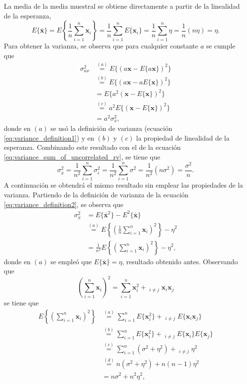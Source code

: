 \documentclass[a4paper]{report}
\newcommand{\x}{\mathbf{x}}
\begin{document}
La media de la media muestral se obtiene directamente a partir de la linealidad de la esperanza,
\[
 E\{\bar{\x}\}=E\left\{\frac{1}{n}\sum_{i=1}^{n}\x_i\right\}=\frac{1}{n}\sum_{i=1}^{n}E\{\x_i\}=\frac{1}{n}\sum_{i=1}^{n}\eta=\frac{1}{n}(n\eta)=\eta.
\]
Para obtener la varianza, se observa que para cualquier constante \(a\) se cumple que
\begin{align*}
 \sigma_{ax}^2&\overset{(a)}{=}E\{(a\x-E\{a\x\})^2\}\\
   &\overset{(b)}{=}E\{(a\x-aE\{\x\})^2\}\\
   &=E\{a^2(\x-E\{\x\})^2\}\\
   &\overset{(c)}{=}a^2E\{(\x-E\{\x\})^2\}\\
   &=a^2\sigma_x^2,
\end{align*}
donde en \((a)\) se usó la definición de varianza (ecuación \ref{eq:variance_definition1}) y en \((b)\) y \((c)\) la propiedad de linealidad de la esperanza.
Combinando este resultado con el de la ecuación \ref{eq:variance_sum_of_uncorrelated_rv}, se tiene que
\[
 \sigma_{\bar{x}}^2=\frac{1}{n^2}\sum_{i=1}^{n}\sigma_i^2=\frac{1}{n^2}\sum_{i=1}^{n}\sigma^2=\frac{1}{n^2}(n\sigma^2)=\frac{\sigma^2}{n}.
\]
A continuación se obtendrá  el mismo resultado sin emplear las propiedades de la varianza. Partiendo de la definición de varianza de la ecuación \ref{eq:variance_definition2}, se observa que
\begin{align}\label{eq:sample_mean_variance_aux}
 \sigma_{\bar{x}}^2&=E\{\bar{\x}^2\}-E^2\{\bar{\x}\}\nonumber\\
   &\overset{(a)}{=}E\left\{\left(\frac{1}{n}\sum_{i=1}^{n}\x_i\right)^2\right\}-\eta^2\nonumber\\
   &=\frac{1}{n^2}E\left\{\left(\sum_{i=1}^{n}\x_i\right)^2\right\}-\eta^2,
\end{align}
donde en \((a)\) se empleó que \(E\{\bar{\x}\}=\eta\), resultado obtenido antes. Observando que
\[
 \left(\sum_{i=1}^{n}\x_i\right)^2=\sum_{i=1}^{n}\x_i^2+\mathop{\sum_{i=1}^n\sum_{j=1}^n}_{i\neq j}\x_i\x_j
\]
se tiene que
\begin{align*}
 E\left\{\left(\sum_{i=1}^{n}\x_i\right)^2\right\}&\overset{(a)}{=}\sum_{i=1}^{n}E\{\x_i^2\}+\mathop{\sum_{i=1}^n\sum_{j=1}^n}_{i\neq j}E\{\x_i\x_j\}\\
  &\overset{(b)}{=}\sum_{i=1}^{n}E\{\x_i^2\}+\mathop{\sum_{i=1}^n\sum_{j=1}^n}_{i\neq j}E\{\x_i\}E\{\x_j\}\\
  &\overset{(c)}{=}\sum_{i=1}^{n}(\sigma^2+\eta^2)+\mathop{\sum_{i=1}^n\sum_{j=1}^n}_{i\neq j}\eta^2\\
  &\overset{(d)}{=}n(\sigma^2+\eta^2)+n(n-1)\eta^2\\
  &=n\sigma^2+n^2\eta^2,
\end{align*}
\end{document}
